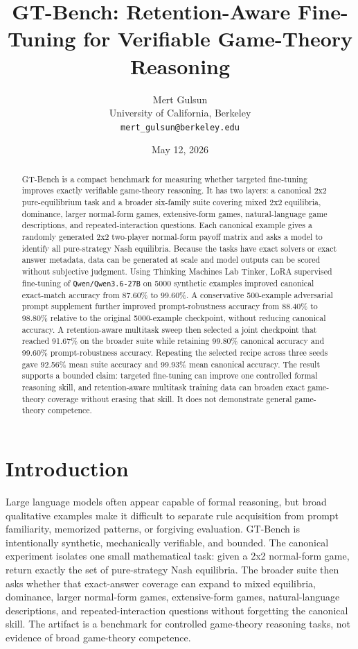 \documentclass[11pt]{article}
\title{GT-Bench: Retention-Aware Fine-Tuning for Verifiable Game-Theory Reasoning}
\author{
  Mert Gulsun\\
  University of California, Berkeley\\
  \texttt{mert\_gulsun@berkeley.edu}
}
\date{May 12, 2026}
\newcommand{\modelname}{\texttt{Qwen/\allowbreak Qwen3.6-27B}}
\begin{document}
\maketitle

\begin{abstract}
GT-Bench is a compact benchmark for measuring whether targeted fine-tuning improves exactly verifiable game-theory reasoning. It has two layers: a canonical 2x2 pure-equilibrium task and a broader six-family suite covering mixed 2x2 equilibria, dominance, larger normal-form games, extensive-form games, natural-language game descriptions, and repeated-interaction questions. Each canonical example gives a randomly generated 2x2 two-player normal-form payoff matrix and asks a model to identify all pure-strategy Nash equilibria. Because the tasks have exact solvers or exact answer metadata, data can be generated at scale and model outputs can be scored without subjective judgment. Using Thinking Machines Lab Tinker, LoRA supervised fine-tuning of \modelname{} on 5000 synthetic examples improved canonical exact-match accuracy from 87.60\% to 99.60\%. A conservative 500-example adversarial prompt supplement further improved prompt-robustness accuracy from 88.40\% to 98.80\% relative to the original 5000-example checkpoint, without reducing canonical accuracy. A retention-aware multitask sweep then selected a joint checkpoint that reached 91.67\% on the broader suite while retaining 99.80\% canonical accuracy and 99.60\% prompt-robustness accuracy. Repeating the selected recipe across three seeds gave 92.56\% mean suite accuracy and 99.93\% mean canonical accuracy. The result supports a bounded claim: targeted fine-tuning can improve one controlled formal reasoning skill, and retention-aware multitask training data can broaden exact game-theory coverage without erasing that skill. It does not demonstrate general game-theory competence.
\end{abstract}

\section{Introduction}

Large language models often appear capable of formal reasoning, but broad qualitative examples make it difficult to separate rule acquisition from prompt familiarity, memorized patterns, or forgiving evaluation. GT-Bench is intentionally synthetic, mechanically verifiable, and bounded. The canonical experiment isolates one small mathematical task: given a 2x2 normal-form game, return exactly the set of pure-strategy Nash equilibria. The broader suite then asks whether that exact-answer coverage can expand to mixed equilibria, dominance, larger normal-form games, extensive-form games, natural-language descriptions, and repeated-interaction questions without forgetting the canonical skill. The artifact is a benchmark for controlled game-theory reasoning tasks, not evidence of broad game-theory competence.
\end{document}
